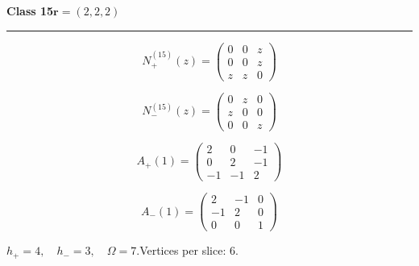 \noindent\begin{minipage}{\linewidth}
\noindent\textbf{Class 15}\hfill $\symbf{r}=(2,2,2)$
\par\smallskip\noindent\textcolor{rulegray}{\rule{\linewidth}{0.3pt}}
\begin{minipage}[c]{0.495\linewidth}\centering\fontsize{10.5}{13}\selectfont
\setlength{\abovedisplayskip}{3pt}\setlength{\belowdisplayskip}{3pt}
\setlength{\abovedisplayshortskip}{3pt}\setlength{\belowdisplayshortskip}{3pt}
\setlength{\arraycolsep}{3.5pt}\renewcommand{\arraystretch}{1.18}
\[N_{+}^{(15)}(z)=\begin{pmatrix}0 & 0 & z\\0 & 0 & z\\z & z & 0\end{pmatrix}\]
\end{minipage}%
\begin{minipage}[c]{0.495\linewidth}\centering\fontsize{10.5}{13}\selectfont
\setlength{\abovedisplayskip}{3pt}\setlength{\belowdisplayskip}{3pt}
\setlength{\abovedisplayshortskip}{3pt}\setlength{\belowdisplayshortskip}{3pt}
\setlength{\arraycolsep}{3.5pt}\renewcommand{\arraystretch}{1.18}
\[N_{-}^{(15)}(z)=\begin{pmatrix}0 & z & 0\\z & 0 & 0\\0 & 0 & z\end{pmatrix}\]
\end{minipage}%
\par\noindent
\begin{minipage}[c]{0.495\linewidth}\centering\fontsize{10.5}{13}\selectfont
\setlength{\abovedisplayskip}{3pt}\setlength{\belowdisplayskip}{3pt}
\setlength{\abovedisplayshortskip}{3pt}\setlength{\belowdisplayshortskip}{3pt}
\setlength{\arraycolsep}{3.5pt}\renewcommand{\arraystretch}{1.18}
\[A_{+}(1)=\begin{pmatrix}2 & 0 & -1\\0 & 2 & -1\\-1 & -1 & 2\end{pmatrix}\]
\end{minipage}%
\begin{minipage}[c]{0.495\linewidth}\centering\fontsize{10.5}{13}\selectfont
\setlength{\abovedisplayskip}{3pt}\setlength{\belowdisplayskip}{3pt}
\setlength{\abovedisplayshortskip}{3pt}\setlength{\belowdisplayshortskip}{3pt}
\setlength{\arraycolsep}{3.5pt}\renewcommand{\arraystretch}{1.18}
\[A_{-}(1)=\begin{pmatrix}2 & -1 & 0\\-1 & 2 & 0\\0 & 0 & 1\end{pmatrix}\]
\end{minipage}%
\par\smallskip\noindent\small $h_+=4,\quad h_-=3,\quad \Omega=7.$\quad Vertices per slice: 6.
\end{minipage}\par\vfill
